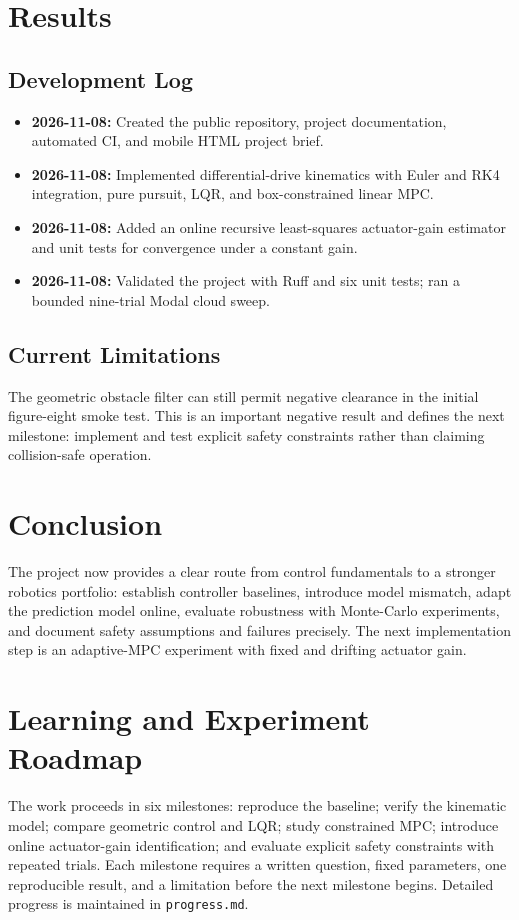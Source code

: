 \documentclass[11pt,a4paper]{article}
\begin{document}
\section{Results}
\subsection{Development Log}
\begin{itemize}
  \item \textbf{2026-11-08:} Created the public repository, project documentation, automated CI, and mobile HTML project brief.
  \item \textbf{2026-11-08:} Implemented differential-drive kinematics with Euler and RK4 integration, pure pursuit, LQR, and box-constrained linear MPC.
  \item \textbf{2026-11-08:} Added an online recursive least-squares actuator-gain estimator and unit tests for convergence under a constant gain.
  \item \textbf{2026-11-08:} Validated the project with Ruff and six unit tests; ran a bounded nine-trial Modal cloud sweep.
\end{itemize}

\subsection{Current Limitations}
The geometric obstacle filter can still permit negative clearance in the initial figure-eight smoke test. This is an important negative result and defines the next milestone: implement and test explicit safety constraints rather than claiming collision-safe operation.

\section{Conclusion}
The project now provides a clear route from control fundamentals to a stronger robotics portfolio: establish controller baselines, introduce model mismatch, adapt the prediction model online, evaluate robustness with Monte-Carlo experiments, and document safety assumptions and failures precisely. The next implementation step is an adaptive-MPC experiment with fixed and drifting actuator gain.

\section{Learning and Experiment Roadmap}
The work proceeds in six milestones: reproduce the baseline; verify the kinematic model; compare geometric control and LQR; study constrained MPC; introduce online actuator-gain identification; and evaluate explicit safety constraints with repeated trials. Each milestone requires a written question, fixed parameters, one reproducible result, and a limitation before the next milestone begins. Detailed progress is maintained in \texttt{progress.md}.
\end{document}
